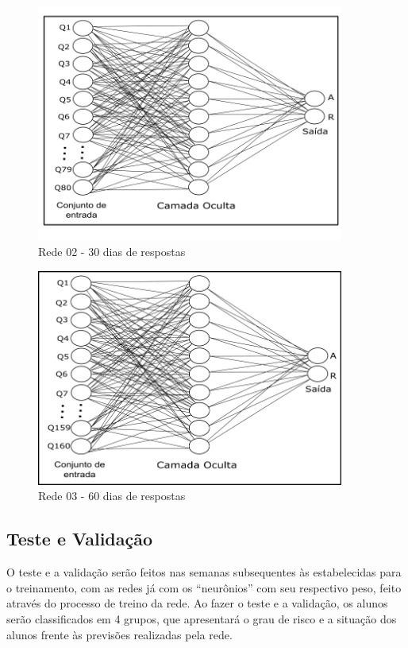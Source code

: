 \documentclass[
	12pt,				%
	openright,			%
	oneside,
	a4paper,			%
	english,			%
	french,				%
	spanish,			%
	brazil,				%
	]{abntex2}
\begin{document}
\begin{figure}
    \centering
    \includegraphics[width=0.9\textwidth]{Modelo_Projeto_Pesquisa_UFG_REJ_BCC/rede02_30.png}
    \caption{Rede 02 - 30 dias de respostas}
    \label{fig:rede02}
\end{figure}

\begin{figure}
    \centering
    \includegraphics[width=0.9\textwidth]{Modelo_Projeto_Pesquisa_UFG_REJ_BCC/rede03_60.png}
    \caption{Rede 03 - 60 dias de respostas}
    \label{fig:rede03}
\end{figure}

\subsection{Teste e Validação}

O teste e a validação serão feitos nas semanas subsequentes às estabelecidas para o treinamento, com as redes já com os ``neurônios'' com seu respectivo peso, feito através do processo de treino da rede. Ao fazer o teste e a validação, os alunos serão classificados em 4 grupos, que apresentará o grau de risco e a situação dos alunos frente às previsões realizadas pela rede.
\end{document}
